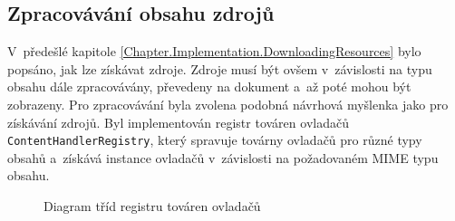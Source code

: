 \subsection{Zpracovávání obsahu zdrojů}
\label{Chapter.Implementation.ContentHandling}

V~předešlé kapitole \ref{Chapter.Implementation.DownloadingResources} bylo popsáno, jak lze získávat zdroje. Zdroje musí být ovšem v~závislosti na typu obsahu dále zpracovávány, převedeny na dokument a~až poté mohou být zobrazeny. Pro zpracovávání byla zvolena podobná návrhová myšlenka jako pro získávání zdrojů. Byl implementován registr továren ovladačů \texttt{ContentHandlerRegistry}, který spravuje továrny ovladačů pro různé typy obsahů a~získává instance ovladačů v~závislosti na požadovaném MIME typu obsahu.

\begin{figure}[H]
  \begin{center}
    \caption{Diagram tříd registru továren ovladačů}
    \label{Figure.ContentHandlerRegistry}
  \end{center}
\end{figure}

